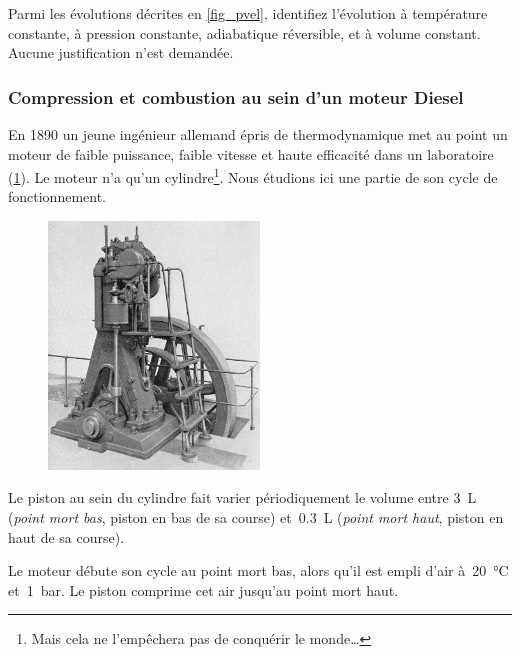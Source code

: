 	Parmi les évolutions décrites en \cref{fig_pvel}, identifiez l’évolution à température constante, à pression constante, adiabatique réversible, et à volume constant. Aucune justification n’est demandée.


\subsubsection{Compression et combustion au sein d’un moteur Diesel}


	En 1890 un jeune ingénieur allemand épris de thermodynamique met au point un moteur de faible puissance, faible vitesse et haute efficacité dans un laboratoire (\cref{fig_exo_diesel}). Le moteur n’a qu’un cylindre\footnote{Mais cela ne l’empêchera pas de conquérir le monde…}. Nous étudions ici une partie de son cycle de fonctionnement. %
	\begin{figure}
		\begin{center}
			\includegraphics[width=0.5\textwidth]{images/Dieselmotor_1898_retouched.jpg}
		\end{center}
		\label{fig_exo_diesel}
	\end{figure}
	
	Le piston au sein du cylindre fait varier périodiquement le volume entre \SI{3}{\liter} (\textit{point mort bas}, piston en bas de sa course) et~\SI{0,3}{\liter} (\textit{point mort haut}, piston en haut de sa course).
	
	Le moteur débute son cycle au point mort bas, alors qu’il est empli d’air à~\SI{20}{\degreeCelsius} et~\SI{1}{\bar}. Le piston comprime cet air jusqu’au point mort haut.
	
